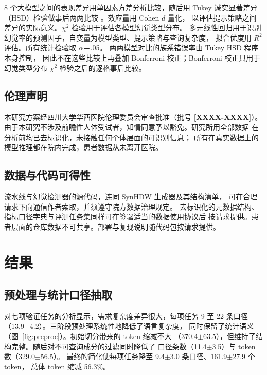 \documentclass[11pt,a4paper]{article}
\newcommand{\PH}[1]{{\color{red}\textbf{[#1]}}}
\begin{document}
8 个大模型之间的表现差异用单因素方差分析比较，随后用 Tukey 诚实显著差异
（HSD）检验做事后两两比较 \cite{tukey1949}。效应量用 Cohen $d$ 量化，
以评估提示策略之间差异的实际意义。$\chi^2$ 检验用于评估各模型幻觉类型分布。
多元线性回归用于识别幻觉率的预测因子，自变量为模型类型、提示策略与查询复杂度，
拟合优度用 $R^2$ 评估。所有统计检验取 $\alpha$＝.05。
两两模型对比的族系错误率由 Tukey HSD 程序本身控制，
因此不在这些比较上再叠加 Bonferroni 校正；Bonferroni 校正只用于
幻觉类型分布 $\chi^2$ 检验之后的逐格事后比较。

\subsection{伦理声明}\label{sec:cn-ethics}
本研究方案经四川大学华西医院伦理委员会审查批准（批号 \PH{XXXX-XXXX}）。
由于本研究不涉及前瞻性人体受试者，知情同意予以豁免。研究所用全部数据
在分析前均已去标识化，未接触任何个体层面的可识别信息；
所有在真实数据上的模型推理都在院内完成，患者数据从未离开医院。

\subsection{数据与代码可得性}\label{sec:cn-avail}
流水线与幻觉检测器的源代码，连同 SynHDW 生成器及其结构清单，
可在合理请求下向通信作者索取，并须遵守院方数据治理规定。
去标识化的元数据结构、指标口径字典与评测任务集同样可在签署适当的数据使用协议后
按请求提供。患者层面的仓库数据不可共享。部署与复现说明随代码包按请求提供。

\section{结果}
\subsection{预处理与统计口径抽取}
对七项验证任务的分析显示，需求复杂度差异很大，每项任务 9 至 22 条口径
（13.9$\pm$4.2）。三阶段预处理系统性地降低了语言复杂度，
同时保留了统计语义（图~\ref{fig:preproc}）。初始切分带来的 token 缩减不大
（370.4$\pm$63.5），但维持了结构完整。随后对不可查询成分的过滤同时降低了
口径条数（11.4$\pm$3.5）与 token 数（329.0$\pm$56.5）。
最终的简化使每项任务降至 9.4$\pm$3.0 条口径、161.9$\pm$27.9 个 token，
总体 token 缩减 56.3\%。
\end{document}
